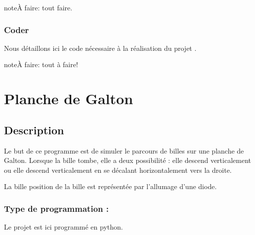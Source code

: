 \documentclass[letterpaper,10pt,french]{sphinxmanual}
\begin{document}
\begin{sphinxadmonition}{note}{\label{projets/coffre-fabriquer:index-0}À faire:}
tout faire.
\end{sphinxadmonition}

\ignorespaces 

\subsubsection{Coder}
\label{\detokenize{projets/coffre-coder:index-0}}\label{\detokenize{projets/coffre-coder:coder}}\label{\detokenize{projets/coffre-coder::doc}}
Nous détaillons ici le code nécessaire à la réalisation
du projet {\hyperref[\detokenize{projets/coffre:projetcoffre}]{}}.

\begin{sphinxadmonition}{note}{\label{projets/coffre-coder:index-1}À faire:}
tout à faire!
\end{sphinxadmonition}


\section{Planche de Galton}
\label{\detokenize{projets/galton:planche-de-galton}}\label{\detokenize{projets/galton::doc}}\label{\detokenize{projets/galton:projetgalton}}

\subsection{Description}
\label{\detokenize{projets/galton:description}}
Le but de ce programme est de simuler le parcours de billes sur
une planche de Galton.
Lorsque la bille tombe, elle a deux possibilité : elle descend verticalement ou elle
descend verticalement en se décalant horizontalement vers la droite.

La bille position de la bille est représentée par l’allumage d’une diode.
\begin{quote}

\noindent{}
\end{quote}


\subsubsection{Type de programmation :}
\label{\detokenize{projets/galton:type-de-programmation}}
Le projet est ici programmé en python.
\end{document}
